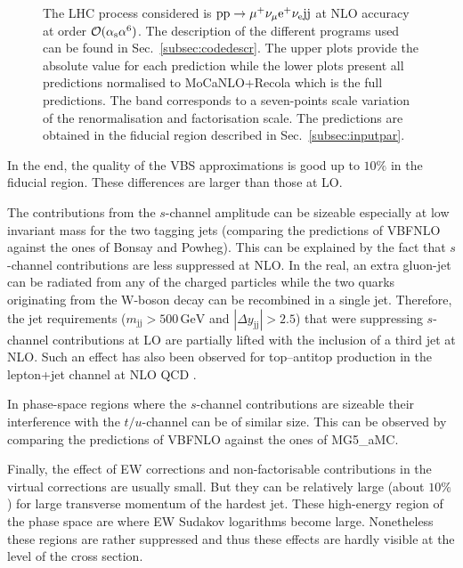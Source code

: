 \documentclass[twocolumn,epjc3]{svjour3} %
\newcommand{\Pj}{\ensuremath{\text{j}}\xspace}
\newcommand{\GeV}{\ensuremath{\,\text{GeV}}\xspace}
\begin{document}
\begin{figure}[hbt!]
{    The LHC process considered is ${\rm p}{\rm p}\to\mu^+\nu_\mu{\rm e}^+\nu_{\rm e}{\rm j}{\rm j}$ at NLO accuracy at order $\mathcal{O}(\alpha_{\rm s}\alpha^6)$.
    The description of the different programs used can be found in Sec.~\protect\ref{subsec:codedescr}.
    The upper plots provide the absolute value for each prediction while the lower plots present all predictions normalised to {\sc MoCaNLO}+{\sc Recola} which is the full predictions.
    The band corresponds to a seven-points scale variation of the renormalisation and factorisation scale.
    The predictions are obtained in the fiducial region described in Sec.~\protect\ref{subsec:inputpar}.
    }
    \end{figure}

    In the end, the quality of the VBS approximations is good up to $10\%$ in the fiducial region.
    These differences are larger than those at LO.

    The contributions from the $s$-channel amplitude can be sizeable especially at low invariant mass for the two tagging jets (comparing the predictions of {\sc VBFNLO} against the ones of {\sc Bonsay} and {\sc Powheg}).
    This can be explained by the fact that $s$-channel contributions are less suppressed at NLO.
    In the real, an extra gluon-jet can be radiated from any of the charged particles while the two quarks originating from the W-boson decay can be recombined in a single jet.
    Therefore, the jet requirements ($ m_{\Pj \Pj} >  500\GeV$ and $|\Delta y_{\Pj \Pj}| > 2.5$) that were suppressing $s$-channel contributions at LO are partially lifted with the inclusion of a third jet at NLO.
    Such an effect has also been observed for top--antitop production in the lepton+jet channel at NLO QCD \cite{Denner:2017kzu}.

    In phase-space regions where the $s$-channel contributions are sizeable their interference with the $t/u$-channel can be of similar size.
    This can be observed by comparing the predictions of {\sc VBFNLO} against the ones of {\sc MG5\_aMC}.

    Finally, the effect of EW corrections and non-factorisable contributions in the virtual corrections are usually small.
    But they can be relatively large (about $10\%$) for large transverse momentum of the hardest jet.
    These high-energy region of the phase space are where EW Sudakov logarithms become large.
    Nonetheless these regions are rather suppressed and thus these effects are hardly visible at the level of the cross section.
\end{document}
